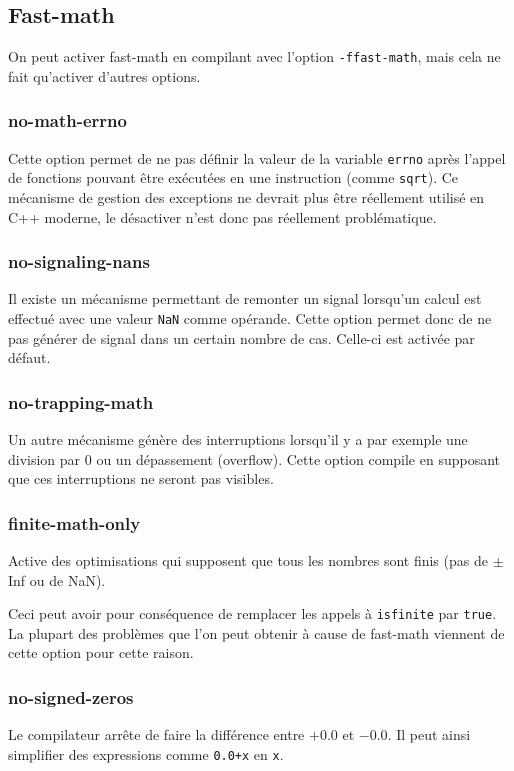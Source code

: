 \documentclass[a4paper]{report}
\begin{document}
\subsection{Fast-math}
On peut activer fast-math en compilant avec l'option \verb'-ffast-math', mais cela ne fait qu'activer d'autres options.

\subsubsection{no-math-errno}
Cette option permet de ne pas définir la valeur de la variable \verb'errno' après l'appel de fonctions pouvant être exécutées en une instruction (comme \verb'sqrt').
Ce mécanisme de gestion des exceptions ne devrait plus être réellement utilisé en C++ moderne, le désactiver n'est donc pas réellement problématique.

\subsubsection{no-signaling-nans}
Il existe un mécanisme permettant de remonter un signal lorsqu'un calcul est effectué avec une valeur \verb'NaN' comme opérande.
Cette option permet donc de ne pas générer de signal dans un certain nombre de cas.
Celle-ci est activée par défaut.

\subsubsection{no-trapping-math}
Un autre mécanisme génère des interruptions lorsqu'il y a par exemple une division par 0 ou un dépassement (overflow).
Cette option compile en supposant que ces interruptions ne seront pas visibles.

\subsubsection{finite-math-only}
Active des optimisations qui supposent que tous les nombres sont finis (pas de $\pm$Inf ou de NaN).

Ceci peut avoir pour conséquence de remplacer les appels à \verb'isfinite' par \verb'true'.
La plupart des problèmes que l'on peut obtenir à cause de fast-math viennent de cette option pour cette raison.

\subsubsection{no-signed-zeros}
Le compilateur arrête de faire la différence entre $+0.0$ et $-0.0$.
Il peut ainsi simplifier des expressions comme \verb'0.0+x' en \verb'x'.
\end{document}
